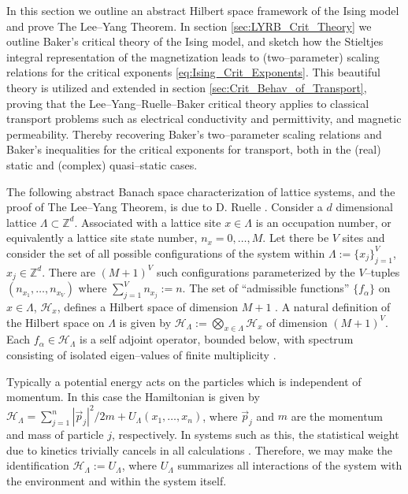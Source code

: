 \documentclass[english,12pt]{ttuthes}
\newcommand{\Hc}{\mathcal{H}}
\begin{document}
In this section we outline an abstract Hilbert space
framework of the Ising model and prove The Lee--Yang Theorem. In
section \ref{sec:LYRB_Crit_Theory} we outline Baker's critical
theory of the Ising model, and sketch how the Stieltjes integral
representation of the magnetization leads to (two--parameter) scaling
relations for the critical exponents
\eqref{eq:Ising_Crit_Exponents}. This beautiful theory is utilized and
extended in section \ref{sec:Crit_Behav_of_Transport}, proving that
the Lee--Yang--Ruelle--Baker critical theory applies to classical 
transport problems such as electrical conductivity and permittivity,
and magnetic permeability. Thereby recovering Baker's two--parameter
scaling relations and Baker's inequalities for the critical exponents
for transport, both in the (real) static and (complex) quasi--static
cases.   

The following abstract Banach space characterization of lattice
systems, and the proof of The Lee--Yang Theorem, is due to D. Ruelle 
\cite{Ruelle-1969}. Consider a $d$ dimensional lattice
$\Lambda\subset\mathbb{Z}^d$. Associated with a lattice site $x\in\Lambda$ is an
occupation number, or equivalently a lattice site state number,
$n_x=0,\ldots,M$. Let there be $V$ sites and consider the 
set of all possible configurations of the system within $\Lambda:=\{x_j\}_{j=1}^V$,
$x_j\in\mathbb{Z}^d$. There are $(M+1)^V$ such configurations
parameterized by the $V$--tuples $(n_{x_1},\ldots,n_{x_V})$ where
$\sum_{j=1}^Vn_{x_j}:=n$. The set of ``admissible functions'' $\{f_\alpha\}$ on
$x\in\Lambda$, $\mathscr{H}_x$,  defines a Hilbert space of dimension $M+1$
\cite{Ruelle-1969}. A natural definition of the Hilbert space on $\Lambda$
is  given by $\mathscr{H}_\Lambda:= \bigotimes_{x\in\Lambda}\mathscr{H}_x$ of dimension
$(M+1)^V$. Each $f_\alpha\in\mathscr{H}_\Lambda$ is a self adjoint operator,
bounded below, with spectrum consisting of isolated eigen--values of
finite multiplicity \cite{Ruelle-1969}. 

Typically a potential energy acts on the particles
which is independent of momentum. In this case the Hamiltonian is
given by $\Hc_\Lambda=\sum_{j=1}^n|\vec{p}_j|^2/2m + U_\Lambda(x_1,\ldots,x_n)$,
where $\vec{p}_j$ and $m$ are the momentum and mass of
particle $j$, respectively. In systems such as this, the statistical
weight due to kinetics trivially cancels in all calculations
\cite{Thompson-1988,Ruelle-1969}. Therefore, we may make the
identification $\Hc_\Lambda:= U_\Lambda$, where $U_\Lambda$ summarizes all
interactions of the system with the environment and within the system
itself. 
\end{document}

